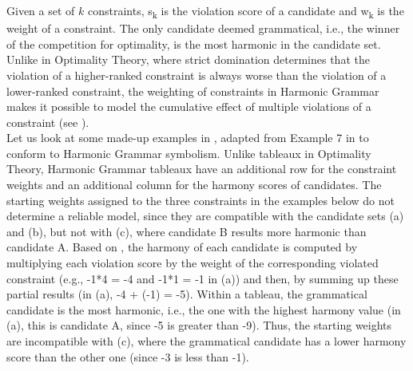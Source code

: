 Given a set of $k$ constraints, s\textsubscript{k} is the violation score of a candidate and w\textsubscript{k} is the weight of a constraint. The only candidate deemed grammatical, i.e., the winner of the competition for optimality, is the most harmonic in the candidate set. Unlike in Optimality Theory, where strict domination determines that the violation of a higher-ranked constraint is always worse than the violation of a lower-ranked constraint, the weighting of constraints in Harmonic Grammar makes it possible to model the cumulative effect of multiple violations of a constraint (see ). \\
Let us look at some made-up examples in , adapted from Example 7 in \textcite{kuhn2002corpus} to conform to Harmonic Grammar symbolism. Unlike tableaux in Optimality Theory, Harmonic Grammar tableaux have an additional row for the constraint weights and an additional column for the harmony scores of candidates. The starting weights assigned to the three constraints in the examples below do not determine a reliable model, since they are compatible with the candidate sets (a) and (b), but not with (c), where candidate B results more harmonic than candidate A.  Based on , the harmony of each candidate is computed by multiplying each violation score by the weight of the corresponding violated constraint (e.g., -1*4 = -4 and -1*1 = -1 in (a)) and then, by summing up these partial results (in (a), -4 + (-1) = -5). Within a tableau, the grammatical candidate is the most harmonic, i.e., the one with the highest harmony value (in (a), this is candidate A, since -5 is greater than -9). Thus, the starting weights are incompatible with (c), where the grammatical candidate has a lower harmony score than the other one (since -3 is less than -1).


